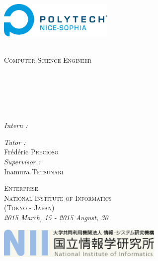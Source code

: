 \begin{titlepage}
\begin{center}
\begin{minipage}[t]{0.49\textwidth}
\begin{flushleft}
  \end{flushleft}
\end{minipage} 
\begin{minipage}[t]{0.49\textwidth}
  \begin{flushright}
    \includegraphics [width=55mm]{images/Logo_polytech_SI.jpg} \\[0.2cm]
  \end{flushright}
\end{minipage} \\[2.0cm]
\vspace*{-1cm}
\textsc{\Large Computer Science Engineer}\\[0.5cm]
\textsc{\Large \reportsubject}\\[0.5cm]
\HRule \\[0.4cm]
{\huge \bfseries \reporttitle}\\[0.4cm]
{\Large \bfseries \reportsubtitle}\\[0.2cm]
\HRule \\[1.5cm]
\vspace*{-1cm}
\begin{minipage}[t]{0.64\textwidth}
  \begin{flushleft} \large
    \emph{Intern :}\\
    \reportauthor
  \end{flushleft}
\end{minipage}
\begin{minipage}[t]{0.35\textwidth}
  \begin{flushleft} \large
    \emph{Tutor :} \\
    Frédéric \textsc{Precioso} \\[0.5cm]
    \emph{Supervisor :} \\
    Inamura \textsc{Tetsunari}
  \end{flushleft}
  \vspace*{0.8cm}
\end{minipage}
\textsc{\Large Enterprise\\National Institute of Informatics\\(Tokyo - Japan)}\\[0.5cm]
{\emph{2015 March, 15 - 2015 August, 30}}\\
\vspace*{0.8cm}
\vfill

\center
\vspace*{0.2cm}
\includegraphics [width=80mm]{images/nii_logo.png} \\[0.6cm]
\end{center}

\end{titlepage}
